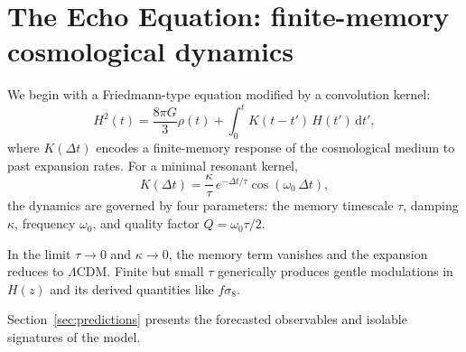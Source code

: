 \section{The Echo Equation: finite-memory cosmological dynamics}
\label{sec:theory}

We begin with a Friedmann-type equation modified by a convolution kernel:
\begin{equation}
    H^2(t) = \frac{8\pi G}{3}\rho(t)
    + \int_0^t K(t - t')\, H(t')\, \mathrm{d}t',
    \label{eq:echo}
\end{equation}
where $K(\Delta t)$ encodes a finite-memory response of the cosmological medium to past expansion rates. For a minimal resonant kernel,
\begin{equation}
    K(\Delta t) = \frac{\kappa}{\tau}\, e^{-\Delta t / \tau}\cos(\omega_0\, \Delta t),
\end{equation}
the dynamics are governed by four parameters: the memory timescale $\tau$, damping $\kappa$, frequency $\omega_0$, and quality factor $Q = \omega_0 \tau / 2$.

In the limit $\tau \rightarrow 0$ and $\kappa \rightarrow 0$, the memory term vanishes and the expansion reduces to $\Lambda$CDM. Finite but small $\tau$ generically produces gentle modulations in $H(z)$ and its derived quantities like $f\sigma_8$.

Section~\ref{sec:predictions} presents the forecasted observables and isolable signatures of the model.
